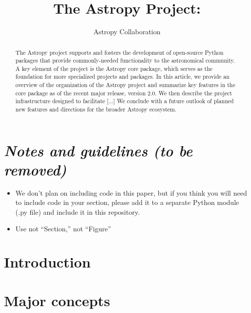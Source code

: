\documentclass[modern]{aastex61}
\newcommand{\escapecmd}[1]{\texttt{\detokenize{#1}}}
\begin{document}
\draft{\today}

\title{The Astropy Project: }


\author{Astropy Collaboration}

\begin{abstract}
The Astropy project supports and fosters the development of open-source Python
packages that provide commonly-needed functionality to the astronomical
community.
A key element of the project is the Astropy core package, which serves as the
foundation for more specialized projects and packages.
In this article, we provide an overview of the organization of the Astropy
project and summarize key features in the core package as of the recent major
release, version 2.0.
We then describe the project infrastructure designed to facilitate [...]
We conclude with a future outlook of planned new features and directions for the
broader Astropy ecosystem.
\end{abstract}

\keywords{}

\section*{\textit{Notes and guidelines (to be removed)}}

\begin{itemize}
	\item We don't plan on including code in this paper, but if you think you will need to include code in your section, please add it to a separate Python module (.py file) and include it in this repository.
    \item Use \escapecmd{\sectionname} not ``Section,'' \escapecmd{\figurename} not ``Figure''
\end{itemize}

\section{Introduction} \label{sec:intro}


\section{Major concepts}
\end{document}
